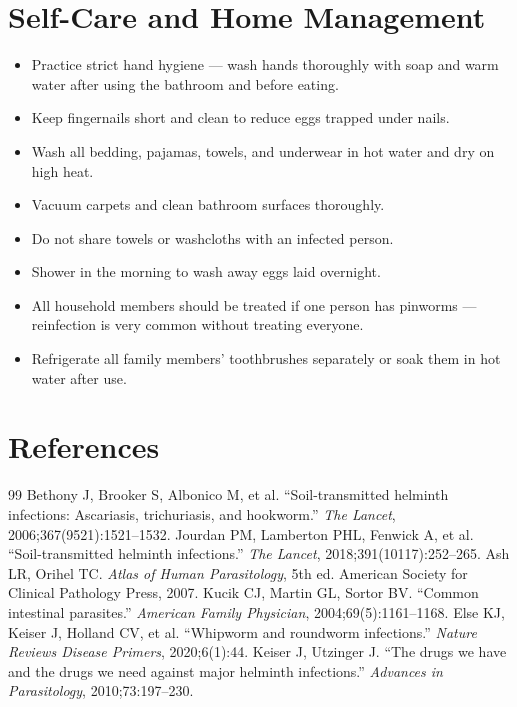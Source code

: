 \section*{Self-Care and Home Management}
\begin{itemize}
  \item Practice strict hand hygiene — wash hands thoroughly with soap and warm water after using the bathroom and before eating.
  \item Keep fingernails short and clean to reduce eggs trapped under nails.
  \item Wash all bedding, pajamas, towels, and underwear in hot water and dry on high heat.
  \item Vacuum carpets and clean bathroom surfaces thoroughly.
  \item Do not share towels or washcloths with an infected person.
  \item Shower in the morning to wash away eggs laid overnight.
  \item All household members should be treated if one person has pinworms — reinfection is very common without treating everyone.
  \item Refrigerate all family members' toothbrushes separately or soak them in hot water after use.
\end{itemize}

\section*{References}
\begin{thebibliography}{99}
 Bethony J, Brooker S, Albonico M, et al. ``Soil-transmitted helminth infections: Ascariasis, trichuriasis, and hookworm.'' \textit{The Lancet}, 2006;367(9521):1521--1532.
 Jourdan PM, Lamberton PHL, Fenwick A, et al. ``Soil-transmitted helminth infections.'' \textit{The Lancet}, 2018;391(10117):252--265.
 Ash LR, Orihel TC. \textit{Atlas of Human Parasitology}, 5th ed. American Society for Clinical Pathology Press, 2007.
 Kucik CJ, Martin GL, Sortor BV. ``Common intestinal parasites.'' \textit{American Family Physician}, 2004;69(5):1161--1168.
 Else KJ, Keiser J, Holland CV, et al. ``Whipworm and roundworm infections.'' \textit{Nature Reviews Disease Primers}, 2020;6(1):44.
 Keiser J, Utzinger J. ``The drugs we have and the drugs we need against major helminth infections.'' \textit{Advances in Parasitology}, 2010;73:197--230.
\end{thebibliography}
